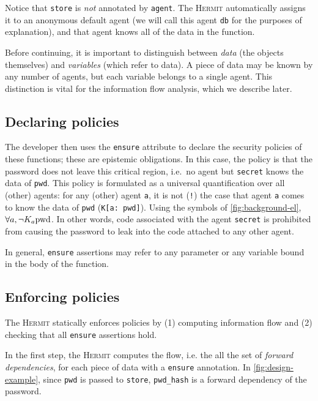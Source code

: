 \documentclass[letterpaper,twocolumn,10pt]{article}
\newcommand{\Hermit}{\textsc{Hermit}\xspace}
\begin{document}
Notice that \lstinline{store} is \emph{not} annotated by \lstinline{agent}.
The \Hermit automatically assigns it to an anonymous default agent (we will call this agent \lstinline{db} for the purposes of explanation), and that agent knows all of the data in the function.

Before continuing, it is important to distinguish between \emph{data} (the objects themselves) and \emph{variables} (which refer to data).
A piece of data may be known by any number of agents, but each variable belongs to a single agent.
This distinction is vital for the information flow analysis, which we describe later.

\subsection{Declaring policies}
\label{sec:design-policies}

The developer then uses the \lstinline{ensure} attribute to declare the security policies of these functions; these are epistemic obligations.
In this case, the policy is that the password does not leave this critical region, i.e.\ no agent but \lstinline{secret} knows the data of \lstinline{pwd}.
This policy is formulated as a universal quantification over all (other) agents:
for any (other) agent \lstinline{a}, it is not (\lstinline{!}) the case that agent \lstinline{a} comes to know the data of \lstinline{pwd} (\lstinline{K[a: pwd]}).
Using the symbols of \cref{fig:background-el}, \(\forall a, \lnot K_a \text{\lstinline{pwd}}\).
In other words, code associated with the agent \lstinline{secret} is prohibited from causing the password to leak into the code attached to any other agent.

In general, \lstinline{ensure} assertions may refer to any parameter or any variable bound in the body of the function.

\subsection{Enforcing policies}
\label{sec:design-enforcement}

The \Hermit statically enforces policies by (1) computing information flow and (2) checking that all \lstinline{ensure} assertions hold.

In the first step, the \Hermit computes the flow, i.e. the all the set of \emph{forward dependencies}, for each piece of data with a \lstinline{ensure} annotation.
In \cref{fig:design-example}, since \lstinline{pwd} is passed to \lstinline{store}, \lstinline{pwd_hash} is a forward dependency of the password.
\end{document}
